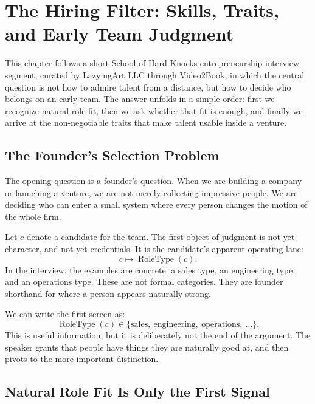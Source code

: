 \chapter{The Hiring Filter: Skills, Traits, and Early Team Judgment}

This chapter follows a short School of Hard Knocks entrepreneurship interview segment, curated by LazyingArt LLC through Video2Book, in which the central question is not how to admire talent from a distance, but how to decide who belongs on an early team. The answer unfolds in a simple order: first we recognize natural role fit, then we ask whether that fit is enough, and finally we arrive at the non-negotiable traits that make talent usable inside a venture.

\section{The Founder’s Selection Problem}

The opening question is a founder's question. When we are building a company or launching a venture, we are not merely collecting impressive people. We are deciding who can enter a small system where every person changes the motion of the whole firm.

Let \(c\) denote a candidate for the team. The first object of judgment is not yet character, and not yet credentials. It is the candidate's apparent operating lane:
\begin{equation}
  c \longmapsto \operatorname{RoleType}(c).
\end{equation}
In the interview, the examples are concrete: a sales type, an engineering type, and an operations type. These are not formal categories. They are founder shorthand for where a person appears naturally strong.

We can write the first screen as:
\begin{equation}
  \operatorname{RoleType}(c) \in
  \{\text{sales},\ \text{engineering},\ \text{operations},\ \ldots\}.
\end{equation}
This is useful information, but it is deliberately not the end of the argument. The speaker grants that people have things they are naturally good at, and then pivots to the more important distinction.

\section{Natural Role Fit Is Only the First Signal}

